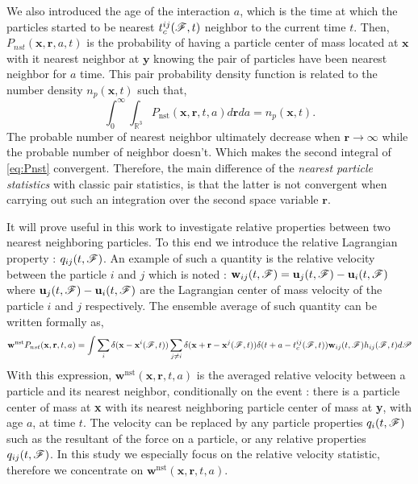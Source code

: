 We also introduced the age of the interaction $a$, which is the time at which the particles started to be nearest $t_c^{ij}(\mathscr{F},t)$ neighbor to the current time $t$. 
Then, $P_{nst}(\textbf{x},\textbf{r},a,t)$ is the probability of having a particle center of mass located at $\textbf{x}$ with it nearest neighbor at $\textbf{y}$ knowing the pair of particles have been nearest neighbor for $a$ time. 
This pair probability density function is related to the number density $n_p(\textbf{x},t)$ such that, 
\begin{equation*}
    \int_0^\infty 
    \int_{\mathbb{R}^3}
    P_\text{nst}(\textbf{x},\textbf{r},t,a) d\textbf{r} da = n_p(\textbf{x},t). 
    \label{eq:Pnst}
\end{equation*}
The probable number of nearest neighbor ultimately decrease when $\textbf{r}\to\infty$ while the probable number  of neighbor doesn't. 
Which makes the second integral of \ref{eq:Pnst} convergent. 
Therefore, the main difference of the \textit{nearest particle statistics} with classic pair statistics, is that the latter is not convergent when carrying out such an integration over the second space variable $\textbf{r}$. 

It will prove useful in this work to investigate relative properties between two nearest neighboring particles. 
To this end we introduce the relative Lagrangian property : $q_{ij}(t,\mathscr{F})$. 
An example of such a quantity is the relative velocity between the particle $i$ and $j$ which is noted : $\textbf{w}_{ij}(t,\mathscr{F}) = \textbf{u}_j(t,\mathscr{F}) - \textbf{u}_i(t,\mathscr{F})$ where $\textbf{u}_j(t,\mathscr{F}) - \textbf{u}_i(t,\mathscr{F})$ are the Lagrangian center of mass velocity of the particle $i$ and $j$ respectively. 
The ensemble average of such quantity can be written formally as, 
\begin{equation*}
    \textbf{w}^\text{nst} P_{nst}(\textbf{x},\textbf{r},t,a)= 
    \int \sum_{i}\delta(\textbf{x}-\textbf{x}^i(\mathscr{F},t))
    \sum_{j\neq i}\delta(\textbf{x}+\textbf{r}-\textbf{x}^j(\mathscr{F},t)) 
    \delta(t+a-t_c^{ij}(\mathscr{F},t)) 
    \textbf{w}_{ij}(t,\mathscr{F})
    h_{ij}(\mathscr{F},t) 
    d\mathscr{P} 
    \label{eq:q_nstij}
\end{equation*}
With this expression, $\textbf{w}^\text{nst}(\textbf{x},\textbf{r},t,a)$ is the averaged relative velocity between a particle and its nearest neighbor, conditionally on the event : there is a particle center of mass at \textbf{x} with its nearest neighboring particle center of mass at \textbf{y}, with age $a$, at time $t$. 
The velocity can be replaced by any particle properties $q_{i}(t,\mathscr{F})$ such as the resultant of the force on a particle, or any relative properties $q_{ij}(t,\mathscr{F})$. 
In this study we especially focus on the relative velocity statistic, therefore we concentrate on  $\textbf{w}^\text{nst}(\textbf{x},\textbf{r},t,a)$. 

